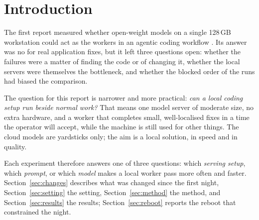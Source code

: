 \clearpage


\tableofcontents
\listoftables
\clearpage

\renewcommand{\sectionmark}[1]{\markboth{\thesection.\ #1}{\thesection.\ #1}}
\renewcommand{\subsectionmark}[1]{}


\section{Introduction}\label{sec:intro}

The first report measured whether open-weight models on a single 128\,GB workstation could act as
the workers in an agentic coding workflow \citep{Anthropic-2026aa}. Its answer was no for real application fixes, but
it left three questions open: whether the failures were a matter of finding the code or of changing it, whether the
local servers were themselves the bottleneck, and whether the blocked order of the runs had biased the comparison.

The question for this report is narrower and more practical: \emph{can a local coding setup run beside normal work?}
That means one model server of moderate size, no extra hardware, and a worker that completes small, well-localised
fixes in a time the operator will accept, while the machine is still used for other things. The cloud models are
yardsticks only; the aim is a local solution, in speed and in quality.

Each experiment therefore answers one of three questions: which \emph{serving setup}, which \emph{prompt}, or which
\emph{model} makes a local worker pass more often and faster. Section~\ref{sec:changes} describes what was changed
since the first night, Section~\ref{sec:setting} the setting, Section~\ref{sec:method} the method, and
Section~\ref{sec:results} the results; Section~\ref{sec:reboot} reports the reboot that constrained the night.


